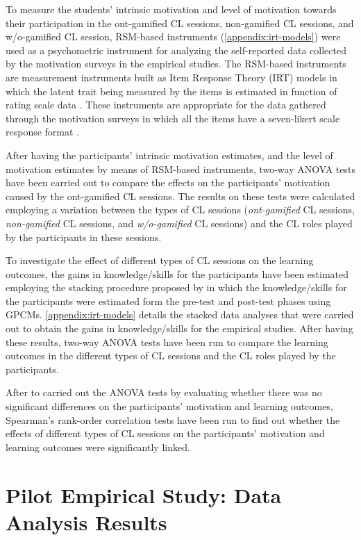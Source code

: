 To measure the students' intrinsic motivation and level of motivation towards their participation in the ont-gamified CL sessions, non-gamified CL sessions, and w/o-gamified CL session, RSM-based instruments (\autoref{appendix:irt-models}) were used as a psychometric instrument for analyzing the self-reported data collected by the motivation surveys in the empirical studies.
The RSM-based instruments are measurement instruments built as Item Response Theory (IRT) models in which the latent trait being measured by the items is estimated in function of rating scale data \cite{George2005}.
These instruments are appropriate for the data gathered through the motivation surveys in which all the items have a seven-likert scale response format \cite{van2013handbook}.

After having the participants' intrinsic motivation estimates, and the level of motivation estimates by means of RSM-based instruments, two-way ANOVA tests have been carried out to compare the effects on the participants' motivation caused by the ont-gamified CL sessions.
The results on these tests were calculated employing a variation between the types of CL sessions (\emph{ont-gamified} CL sessions, \emph{non-gamified} CL sessions, and \emph{w/o-gamified} CL sessions) and the CL roles played by the participants in these sessions.

To investigate the effect of different types of CL sessions on the learning outcomes, the gains in knowledge/skills for the participants have been estimated employing the stacking procedure proposed by  in which the knowledge/skills for the participants were estimated form the pre-test and post-test phases using GPCMs.
\autoref{appendix:irt-models} details the stacked data analyses that were carried out to obtain the gains in knowledge/skills for the empirical studies.
After having these results, two-way ANOVA tests have been run to compare the learning outcomes in the different types of CL sessions and the CL roles played by the participants.

After to carried out the ANOVA tests by evaluating whether there was no significant differences on the participants' motivation and learning outcomes, Spearman's rank-order correlation tests have been run to find out whether the effects of different types of CL sessions on the participants' motivation and learning outcomes were significantly linked.


\section{Pilot Empirical Study: Data Analysis Results}
\label{sec:pilot-study}

